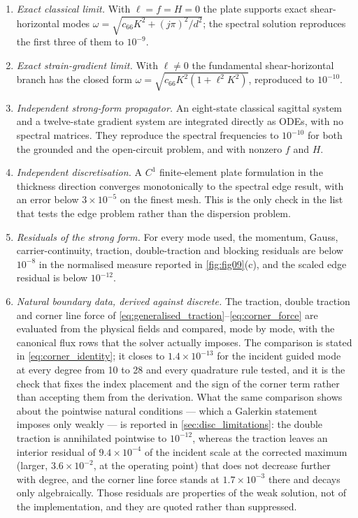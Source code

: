\begin{enumerate}
\item \emph{Exact classical limit.}  With $\ell=f=H=0$ the plate supports
exact shear-horizontal modes $\omega=\sqrt{c_{66}K^2+(j\pi)^2/d^2}$; the spectral
solution reproduces the first three of them to $10^{-9}$.
\item \emph{Exact strain-gradient limit.}  With $\ell\neq0$ the fundamental
shear-horizontal branch has the closed form
$\omega=\sqrt{c_{66}K^2(1+\ell^2K^2)}$, reproduced to $10^{-10}$.
\item \emph{Independent strong-form propagator.}  An eight-state classical
sagittal system and a twelve-state gradient system are integrated directly as
ODEs, with no spectral matrices.  They reproduce the spectral frequencies to
$10^{-10}$ for both the grounded and the open-circuit problem, and with
nonzero $f$ and $H$.
\item \emph{Independent discretisation.}  A $C^1$ finite-element plate
formulation in the thickness direction converges monotonically to the spectral
edge result, with an error below $3\times10^{-5}$ on the finest mesh.  This is
the only check in the list that tests the edge problem rather than the dispersion
problem.
\item \emph{Residuals of the strong form.}  For every mode used, the momentum,
Gauss, carrier-continuity, traction, double-traction and blocking residuals are
below $10^{-8}$ in the normalised measure reported in
\cref{fig:fig09}(c), and the scaled edge residual is below $10^{-12}$.
\item \emph{Natural boundary data, derived against discrete.}  The traction,
double traction and corner line force of
\eqref{eq:generalised_traction}--\eqref{eq:corner_force} are evaluated from the
physical fields and compared, mode by mode, with the canonical flux rows that
the solver actually imposes.  The comparison is stated in
\eqref{eq:corner_identity}; it closes to $1.4\times10^{-13}$ for the incident
guided mode at every degree from 10 to 28 and every quadrature rule tested, and
it is the check that fixes the index placement and the sign of the corner term
rather than accepting them from the derivation.  What the same comparison shows
about the pointwise natural conditions --- which a Galerkin statement imposes
only weakly --- is reported in \cref{sec:disc_limitations}: the double traction
is annihilated pointwise to $10^{-12}$, whereas the traction leaves an interior
residual of $9.4\times10^{-4}$ of the incident scale at the corrected maximum
(larger, $3.6\times10^{-2}$, at the operating point) that does not decrease
further with degree, and the corner line force stands at $1.7\times10^{-3}$ there
and decays only algebraically.  Those residuals are properties of the
weak solution, not of the implementation, and they are quoted rather than
suppressed.
\end{enumerate}

